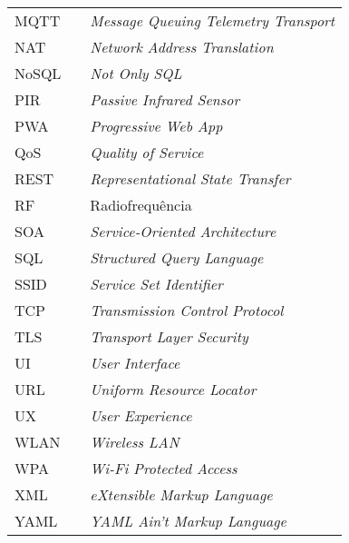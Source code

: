 \begin{table}[H]
\begin{tabular}{lll}
MQTT  &  & \textit{Message Queuing Telemetry Transport}              \\
NAT   &  & \textit{Network Address Translation}                      \\
NoSQL &  & \textit{Not Only SQL}                                     \\
PIR   &  & \textit{Passive Infrared Sensor}                          \\
PWA   &  & \textit{Progressive Web App}                              \\
QoS   &  & \textit{Quality of Service}                               \\
REST  &  & \textit{Representational State Transfer}                  \\
RF    &  & Radiofrequência                                           \\
SOA   &  & \textit{Service-Oriented Architecture}                    \\
SQL   &  & \textit{Structured Query Language}                        \\
SSID  &  & \textit{Service Set Identifier}                           \\
TCP   &  & \textit{Transmission Control Protocol}                    \\
TLS   &  & \textit{Transport Layer Security}                         \\
UI    &  & \textit{User Interface}                                   \\
URL   &  & \textit{Uniform Resource Locator}                         \\
UX    &  & \textit{User Experience}                                  \\
WLAN  &  & \textit{Wireless LAN}                                     \\
WPA   &  & \textit{Wi-Fi Protected Access}                           \\
XML   &  & \textit{eXtensible Markup Language}                       \\
YAML  &  & \textit{YAML Ain't Markup Language}
\end{tabular}
\end{table}
